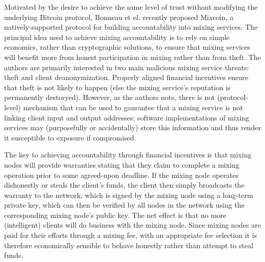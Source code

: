 Motivated by the desire to achieve the same level of trust without modifying the underlying Bitcoin protocol, Bonneau et el. \cite{mixcoin} recently proposed Mixcoin, a natively-supported protocol for building accountability into mixing services. The principal idea used to achieve mixing accountability is to rely on simple economics, rather than cryptographic solutions, to ensure that mixing services will benefit more from honest participation in mixing rather than from theft. The authors are primarily interested in two main malicious mixing service threats: theft and client deanonymization. Properly aligned financial incentives ensure that theft is not likely to happen (else the mixing service's reputation is permanently destoryed). However, as the authors note, there is not (protocol-level) mechanism that can be used to gaurantee that a mixing service is not linking client input and output addresses; software implementations of mixing services may (purposefully or accidentally) store this information and thus render it susceptible to exposure if compromised. 


The key to achieving accountability through financial incentives is that mixing nodes will provide warranties stating that they claim to complete a mixing operation prior to some agreed-upon deadline. If the mixing node operates dishonestly or steals the client's funds, the client then simply broadcasts the warranty to the network, which is signed by the mixing node using a long-term private key, which can then be verified by all nodes in the network using the corresponding mixing node's public key. The net effect is that no more (intelligent) clients will do business with the mixing node. Since mixing nodes are paid for their efforts through a mixing fee, with an appropriate fee selection it is therefore economically sensible to behave honestly rather than attempt to steal funds. 

